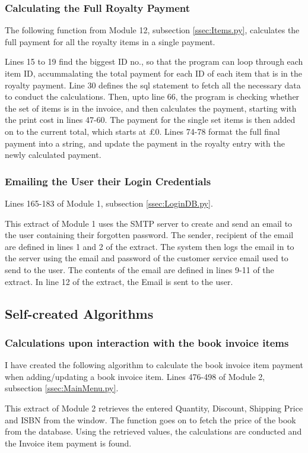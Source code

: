 \subsubsection{Calculating the Full Royalty Payment}
The following function from Module 12, subsection \ref{ssec:Items.py}, calculates the full payment for all the royalty items in a single payment.
\begin{tiny}
\end{tiny}
Lines 15 to 19 find the biggest ID no., so that the program can loop through each item ID, accummalating the total payment for each ID of each item that is in the royalty payment. Line 30 defines the sql statement to fetch all the necessary data to conduct the calculations. Then, upto line 66, the program is checking whether the set of items is in the invoice, and then calculates the payment, starting with the print cost in lines 47-60. The payment for the single set items is then added on to the current total, which starts at £0. Lines 74-78 format the full final payment into a string, and update the payment in the royalty entry with the newly calculated payment.


\subsubsection{Emailing the User their Login Credentials}
Lines 165-183 of Module 1, subsection \ref{ssec:LoginDB.py}.
\begin{tiny}
\end{tiny}
This extract of Module 1 uses the SMTP server to create and send an email to the user containing their forgotten password. The sender, recipient of the email are defined in lines 1 and 2 of the extract. The system then logs the email in to the server using the email and password of the customer service email used to send to the user. The contents of the email are defined in lines 9-11 of the extract. In line 12 of the extract, the Email is sent to the user.

\subsection{Self-created Algorithms}

\subsubsection{Calculations upon interaction with the book invoice items}
I have created the following algorithm to calculate the book invoice item payment when adding/updating a book invoice item.
Lines 476-498 of Module 2, subsection \ref{ssec:MainMenu.py}.
\begin{tiny}
\end{tiny}
This extract of Module 2 retrieves the entered Quantity, Discount, Shipping Price and ISBN from the window. The function goes on to fetch the price of the book from the database. Using the retrieved values, the calculations are conducted and the Invoice item payment is found.


